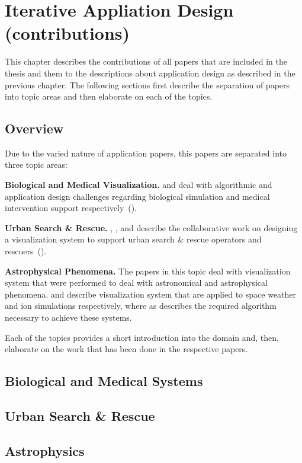 \chapter{Iterative Appliation Design (contributions)}
\label{ch:contributions}

This chapter describes the contributions of all papers that are included in the thesis and them to the descriptions about application design as described in the previous chapter. The following sections first describe the separation of papers into topic areas and then elaborate on each of the topics.

\section{Overview}
\label{sec:overview}
Due to the varied nature of application papers, this papers are separated into three topic areas:

\textbf{Biological and Medical Visualization. }  and  deal with algorithmic and application design challenges regarding biological simulation and medical intervention support respectively~().

\textbf{Urban Search \& Rescue. } , , and  describe the collaborative work on designing a visualization system to support urban search \& rescue operators and rescuers~().

\textbf{Astrophysical Phenomena. } The papers in this topic deal with visualization system that were performed to deal with astronomical and astrophysical phenomena.  and  describe visualization system that are applied to space weather and ion simulations respectively, where as  describes the required algorithm necessary to achieve these systems.

Each of the topics provides a short introduction into the domain and, then, elaborate on the work that has been done in the respective papers.

\section{Biological and Medical Systems}
\label{sec:medbio}




\section{Urban Search \& Rescue}
\label{sec:usar}

\section{Astrophysics}
\label{sec:physics}
